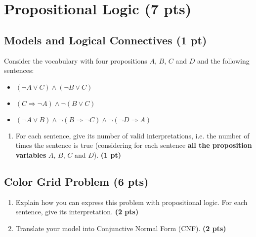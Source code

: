 \documentclass[11pt,a4paper]{report}
\begin{document}
\section{Propositional Logic (7 pts)}

\subsection{Models and Logical Connectives (1 pt)}
Consider the vocabulary with four propositions $A$, $B$, $C$ and $D$ and the
following sentences:
\begin{itemize}
\item $(\neg A \lor C) \land (\neg B \lor C)$
\item $(C \Rightarrow \neg A) \land \neg(B \lor C)$
\item $(\neg A \lor B) \land \neg (B \Rightarrow \neg C) \land \neg (\neg D \Rightarrow A)$
\end{itemize}

\begin{enumerate}
  \item For each sentence, give its number of valid interpretations, i.e. the number of times the sentence is true (considering for each sentence {\bf all the proposition variables} $A$, $B$, $C$ and $D$). \textbf{(1 pt)}
\end{enumerate}

\begin{answer}
\end{answer}



\subsection{Color Grid Problem (6 pts)}

\begin{enumerate}
\item Explain how you can express this problem with propositional logic. For each sentence, give its interpretation. \textbf{(2 pts)}
\end{enumerate}

\begin{answers}[6cm]
\end{answers}



\begin{enumerate}
\setcounter{enumi}{1}
\item Translate your model into Conjunctive Normal Form (CNF). \textbf{(2 pts)}
\end{enumerate}
\end{document}
